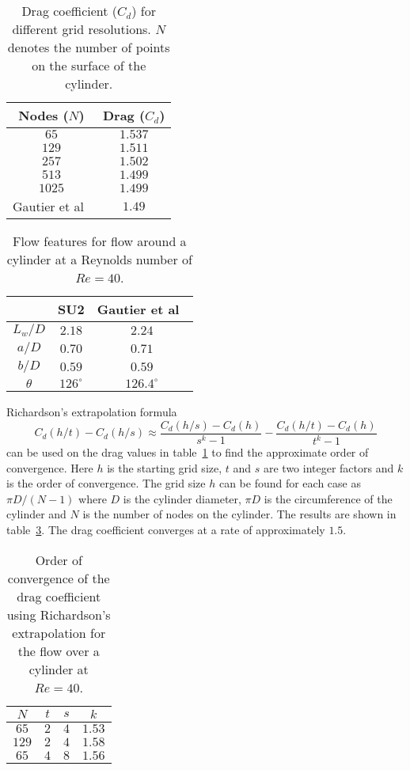 \begin{table}[h!]
\centering
\captionsetup{justification=centering}
\begin{tabular}{ |c|c| } 
\hline
Nodes ($N$) & Drag ($C_d$) \\
\hline
  $65$  & $1.537$ \\ 
 \hline
  $129$  & $1.511$ \\ 
 \hline
 $257$ & $1.502$ \\ 
 \hline
 $513$ & $1.499$ \\ 
 \hline
 $1025$ & $1.499$ \\ 
 \hline
 Gautier et al~\cite{cylinderref} & $1.49$ \\
 \hline
\end{tabular}
\caption{Drag coefficient ($C_d$) for different grid resolutions. $N$ denotes the number of points on the surface of the cylinder.}
\label{tab:lamcylcd}
\end{table}
\begin{table}[h!]
\centering
\captionsetup{justification=centering}
\begin{tabular}{ |c|c|c| } 
\hline
& SU2 & Gautier et al~\cite{cylinderref} \\
\hline
  $L_w/D$  & $2.18$ & $2.24$\\ 
 \hline
  $a/D$  & $0.70$ & $0.71$ \\ 
 \hline
 $b/D$ & $0.59$ & $0.59$\\ 
 \hline
 $\theta$ & $126^{\circ}$ & $126.4^{\circ}$\\ 
 \hline
\end{tabular}
\caption{Flow features for flow around a cylinder at a Reynolds number of $Re=40$.}
\label{tab:lamcylfeat}
\end{table}

Richardson's extrapolation formula~\cite{richardsonext}
\begin{equation}
C_d(h/t) - C_d(h/s) \approx \frac{C_d(h/s) - C_d(h)}{s^k-1} - \frac{C_d(h/t) - C_d(h)}{t^k-1}
\end{equation}
can be used on the drag values in table~\ref{tab:lamcylcd} to find the approximate order of convergence. Here $h$ is the starting grid size, $t$ and $s$ are two integer factors and $k$ is the order of convergence. The grid size $h$ can be found for each case as $\pi D/(N-1)$ where $D$ is the cylinder diameter, $\pi D$ is the circumference of the cylinder and $N$ is the number of nodes on the cylinder. The results are shown in table~\ref{tab:lamcylord}. The drag coefficient converges at a rate of approximately $1.5$.
\begin{table}[h!]
\centering
\begin{tabular}{ |c|c|c|c| } 
\hline
 $N$ & $t$ & $s$ & $k$\\
\hline
  $65$  & $2$ & $4$ &$1.53$\\ 
 \hline
  $129$  & $2$ & $4$ & $1.58$\\ 
 \hline
 $65$ & $4$ & $8$&$1.56$\\ 
 \hline
\end{tabular}
\caption{Order of convergence of the drag coefficient using Richardson's extrapolation for the flow over a cylinder at $Re = 40$.}
\label{tab:lamcylord}
\end{table}

